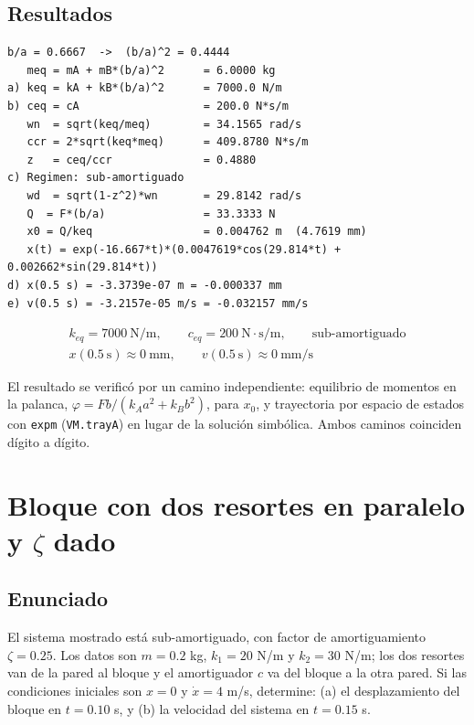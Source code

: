 \documentclass[12pt,letterpaper]{article}
\begin{document}
\subsection{Resultados}
\begin{lstlisting}[style=consola]
   b/a = 0.6667  ->  (b/a)^2 = 0.4444
   meq = mA + mB*(b/a)^2      = 6.0000 kg
a) keq = kA + kB*(b/a)^2      = 7000.0 N/m
b) ceq = cA                   = 200.0 N*s/m
   wn  = sqrt(keq/meq)        = 34.1565 rad/s
   ccr = 2*sqrt(keq*meq)      = 409.8780 N*s/m
   z   = ceq/ccr              = 0.4880
c) Regimen: sub-amortiguado
   wd  = sqrt(1-z^2)*wn       = 29.8142 rad/s
   Q  = F*(b/a)               = 33.3333 N
   x0 = Q/keq                 = 0.004762 m  (4.7619 mm)
   x(t) = exp(-16.667*t)*(0.0047619*cos(29.814*t) + 0.002662*sin(29.814*t))
d) x(0.5 s) = -3.3739e-07 m = -0.000337 mm
e) v(0.5 s) = -3.2157e-05 m/s = -0.032157 mm/s
\end{lstlisting}

\begin{equation}
\boxed{
\begin{gathered}
k_{eq} = 7000\ \text{N/m}, \qquad c_{eq} = 200\ \text{N}\cdot\text{s/m}, \qquad
\text{sub-amortiguado} \\[4pt]
x(0.5\ \text{s}) \approx 0\ \text{mm}, \qquad
v(0.5\ \text{s}) \approx 0\ \text{mm/s}
\end{gathered}}
\end{equation}

El resultado se verificó por un camino independiente: equilibrio de momentos en la
palanca, $\varphi = Fb/(k_Aa^2 + k_Bb^2)$, para $x_0$, y trayectoria por espacio de
estados con \texttt{expm} (\texttt{VM.trayA}) en lugar de la solución simbólica. Ambos
caminos coinciden dígito a dígito.

\newpage
\section{Bloque con dos resortes en paralelo y $\zeta$ dado}

\subsection{Enunciado}

El sistema mostrado está sub-amortiguado, con factor de amortiguamiento
$\zeta = 0.25$. Los datos son $m = 0.2$ kg, $k_1 = 20$ N/m y $k_2 = 30$ N/m; los dos
resortes van de la pared al bloque y el amortiguador $c$ va del bloque a la otra
pared. Si las condiciones iniciales son $x = 0$ y $\dot{x} = 4$ m/s, determine: (a) el
desplazamiento del bloque en $t = 0.10$ s, y (b) la velocidad del sistema en
$t = 0.15$ s.
\end{document}
